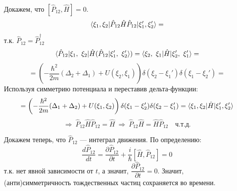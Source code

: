 Докажем, что $[\hat{P}_{12}, \hat{H}] = 0$.
\[
\langle \xi_1, \xi_2 | \hat{P}_{12}\hat{H}\hat{P}_{12} | \xi_1', \xi_2' \rangle = 
\]
т.к. $\hat{P}_{12} = \hat{P}_{12}^\dagger$
\[
\langle \hat{P}_{12} | \xi_1,~\xi_2 | \hat{H}(\hat{P}_{12} | \xi_1',~\xi_2' \rangle) = \langle \xi_2,~\xi_1 | \hat{H} | \xi_2',~\xi_1' \rangle = 
\]
\[
= \left( -\dfrac{\hbar^2}{2m}(\Delta_2 + \Delta_1) + U(\xi_2, \xi_1) \right) \delta(\xi_2 - \xi_1')\delta(\xi_1 - \xi_2') =
\]
Используя симметрию потенциала и переставив дельта-функции:
\[
= \left( -\dfrac{\hbar^2}{2m}(\Delta_1 + \Delta_2) + U(\xi_1, \xi_2) \right) \delta(\xi_1 - \xi_2')\delta(\xi_2 - \xi_1') = \langle \xi_1, \xi_2 | \hat{H} | \xi_1', \xi_2' \rangle 
\]
\[
\Longrightarrow \ \hat{P}_{12}\hat{H}\hat{P}_{12} = \hat{H} \ \Longrightarrow \ \hat{P}_{12}\hat{H} = \hat{H}\hat{P}_{12} \quad \text{ч.т.д.}
\]

Докажем теперь, что $\hat{P}_{12}$ — интеграл движения. По определению:
\[
\dfrac{d\hat{P}_{12}}{dt} = \dfrac{\partial \hat{P}_{12}}{\partial t} + \dfrac{i}{\hbar}[\hat{H}, \hat{P}_{12}] = 0
\]
т.к. нет явной зависимости от $t$, а значит, $\dfrac{\partial \hat{P}_{12}}{\partial t} = 0$. Значит, (анти)симметричность тождественных частиц сохраняется во времени.

